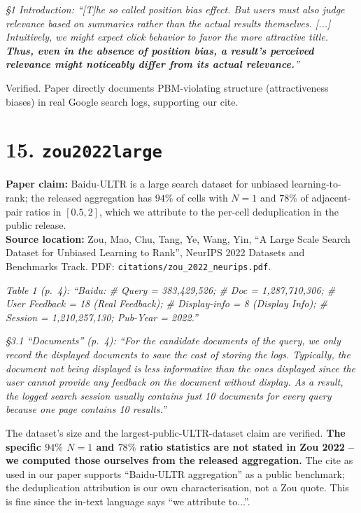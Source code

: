 \documentclass[11pt]{article}
\newcommand{\paperclaim}[1]{\textbf{Paper claim:} #1}
\newcommand{\source}[1]{\textbf{Source location:} #1}
\newcommand{\quoted}[1]{\begin{tcolorbox}\textit{#1}\end{tcolorbox}}
\begin{document}
\quoted{\S1 Introduction: ``[T]he so called position bias effect. But
users must also judge relevance based on summaries rather than the
actual results themselves. [...] Intuitively, we might expect click
behavior to favor the more attractive title. \textbf{Thus, even in the
absence of position bias, a result's perceived relevance might noticeably
differ from its actual relevance.}''}

\noindent Verified. Paper directly documents PBM-violating structure
(attractiveness biases) in real Google search logs, supporting our cite.

\bigskip

\section*{15. \texttt{zou2022large}}
\paperclaim{Baidu-ULTR is a large search dataset for unbiased
learning-to-rank; the released aggregation has $94\%$ of cells with
$N=1$ and $78\%$ of adjacent-pair ratios in $[0.5,2]$, which we
attribute to the per-cell deduplication in the public release.}\\
\source{Zou, Mao, Chu, Tang, Ye, Wang, Yin, ``A Large Scale Search
Dataset for Unbiased Learning to Rank'', NeurIPS 2022 Datasets and
Benchmarks Track. PDF: \texttt{citations/zou\_2022\_neurips.pdf}.}

\quoted{Table 1 (p.~4): ``Baidu: \# Query = 383{,}429{,}526; \# Doc =
1{,}287{,}710{,}306; \# User Feedback = 18 (Real Feedback); \# Display-info
= 8 (Display Info); \# Session = 1{,}210{,}257{,}130; Pub-Year = 2022.''}

\quoted{\S3.1 ``Documents'' (p.~4): ``For the candidate documents of the
query, we only record the displayed documents to save the cost of
storing the logs. Typically, the document not being displayed is less
informative than the ones displayed since the user cannot provide any
feedback on the document without display. As a result, the logged search
session usually contains just 10 documents for every query because one
page contains 10 results.''}

\noindent The dataset's size and the largest-public-ULTR-dataset claim
are verified. \textbf{The specific $94\%$ $N=1$ and $78\%$ ratio
statistics are not stated in Zou 2022 -- we computed those ourselves
from the released aggregation.} The cite as used in our paper supports
``Baidu-ULTR aggregation'' as a public benchmark; the deduplication
attribution is our own characterisation, not a Zou quote. This is fine
since the in-text language says ``we attribute to...''.
\end{document}

